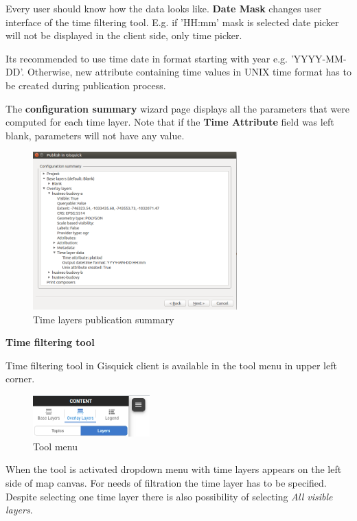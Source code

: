 Every user should know how the data looks like. 
\textbf{Date Mask} changes user interface of the time filtering tool. 
E.g. if 'HH:mm' mask is selected date picker will not be 
displayed in the client side, only time picker. 

Its recommended to use time date in format starting with 
year e.g. 'YYYY-MM-DD'. Otherwise, new attribute containing time 
values in UNIX time format has to be created during publication 
process.

The \textbf{configuration summary} wizard page displays all the parameters 
that were computed for each time layer. Note that if the 
\textbf{Time Attribute} field was left blank, parameters will not have any 
value.

\begin{figure}[h!]
	\centering
	\includegraphics[width=0.7\textwidth]{../img/project-publishing-time-summary.png}
	\caption{Time layers publication summary}
	\label{fig:publication-wizard-summary}
\end{figure}

\bigskip
\noindent \textbf{Time filtering tool}

Time filtering tool in Gisquick client is available in the tool menu 
in upper left corner. 

\begin{figure}[h!]
	\centering
	\includegraphics[width=0.4\textwidth]{../img/burger-menu.png}
	\caption{Tool menu}
	\label{fig:burger-menu}
\end{figure}

\bigskip
When the tool is activated dropdown menu with time layers appears on 
the left side of map canvas. For needs of filtration the time layer 
has to be specified. Despite selecting one time layer there is
also possibility of selecting \textit{All visible layers}.

